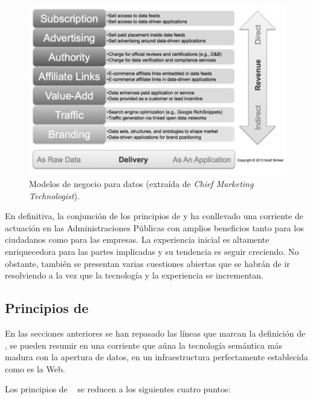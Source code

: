 \begin{figure}[!htb]
\centering
	\includegraphics[width=12cm]{images/phd/data-business-models}
\caption{Modelos de negocio para datos (extraída de \textit{Chief Marketing Technologist}).}
\label{fig:data-business-model}
\end{figure}


En definitiva, la conjunción de los principios de \linkeddata y \opendata ha conllevado una corriente de actuación
en las Administraciones Públicas con amplios beneficios tanto para los ciudadanos como para las empresas. La experiencia inicial es altamente
enriquecedora para las partes implicadas y su tendencia es seguir creciendo. No obstante, también se presentan varias cuestiones
abiertas que se habrán de ir resolviendo a la vez que la tecnología y la experiencia se incrementan.
\subsection{Principios de \linkeddata}\label{principos-linked-data}
En las secciones anteriores se han repasado las líneas que marcan la definición de \linkeddata, se pueden resumir
en una corriente que aúna la tecnología semántica más madura con la apertura de datos, en un infraestructura perfectamente
establecida como es la Web.

Los principios de \linkeddata~\cite{Berners-Lee-2006} se reducen a los siguientes cuatro puntos:

